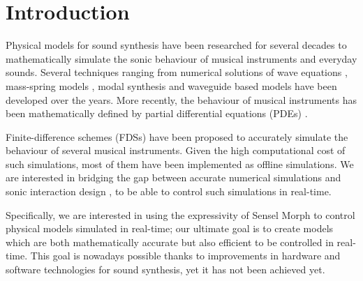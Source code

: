 \documentclass{article}
\title{\papertitle}
\begin{document}
%
\capstartfalse
\maketitle
\capstarttrue
%
\begin{abstract}
In this paper we introduce several physical models of bowed string instruments which use accurate numerical simulations using partial differential equations but are also efficient enough to run in real-time. We describe the mathematical formulation of these models, the real-time implementation in JUCE, the control using the Sensel Morph interface as well as results from qualitative evaluations from experts.
\end{abstract}
%

\section{Introduction}\label{sec:introduction}

Physical models for sound synthesis have been researched for several decades to mathematically simulate the sonic behaviour of musical instruments and everyday sounds.
Several techniques ranging from numerical solutions of wave equations \cite{hiller1971synthesizing}, mass-spring models \cite{cadoz1993cordis}, modal synthesis \cite{morrison1993mosaic} and waveguide based models \cite{smith1992physical} have been developed over the years.
More recently, the behaviour of musical instruments has been mathematically defined by partial differential equations (PDEs) \cite{Bilbao2018:Tutorial}.

Finite-difference schemes (FDSs) have been proposed to accurately simulate the behaviour of several musical instruments.
Given the high computational cost of such simulations, most of them have been implemented as offline simulations.
We are interested in bridging the gap between accurate numerical simulations and sonic interaction design \cite{franinovic2013sonic}, to be able to control such simulations in real-time. 

Specifically, we are interested in using the expressivity of Sensel Morph \cite{sensel2018} to control physical models simulated in real-time; our ultimate goal is to create models which are both mathematically accurate but also efficient to be controlled in real-time. This goal is nowadays possible thanks to improvements in hardware and software technologies for sound synthesis, yet it has not been achieved yet.
\end{document}
